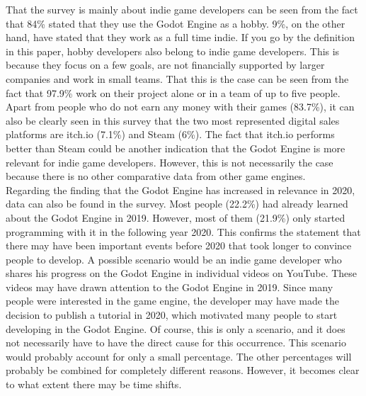 That the survey is mainly about indie game developers can be seen from the fact that 84\% stated that they use the Godot Engine as a hobby.
9\%, on the other hand, have stated that they work as a full time indie.
If you go by the definition in this paper, hobby developers also belong to indie game developers.
This is because they focus on a few goals, are not financially supported by larger companies and work in small teams.
That this is the case can be seen from the fact that 97.9\% work on their project alone or in a team of up to five people.
Apart from people who do not earn any money with their games (83.7\%), it can also be clearly seen in this survey that the two most represented digital sales platforms are itch.io (7.1\%) and Steam (6\%).
The fact that itch.io performs better than Steam could be another indication that the Godot Engine is more relevant for indie game developers.
However, this is not necessarily the case because there is no other comparative data from other game engines. \\

Regarding the finding that the Godot Engine has increased in relevance in 2020, data can also be found in the survey.
Most people (22.2\%) had already learned about the Godot Engine in 2019.
However, most of them (21.9\%) only started programming with it in the following year 2020.
This confirms the statement that there may have been important events before 2020 that took longer to convince people to develop.
A possible scenario would be an indie game developer who shares his progress on the Godot Engine in individual videos on YouTube.
These videos may have drawn attention to the Godot Engine in 2019.
Since many people were interested in the game engine, the developer may have made the decision to publish a tutorial in 2020, which motivated many people to start developing in the Godot Engine.
Of course, this is only a scenario, and it does not necessarily have to have the direct cause for this occurrence.
This scenario would probably account for only a small percentage.
The other percentages will probably be combined for completely different reasons.
However, it becomes clear to what extent there may be time shifts.

